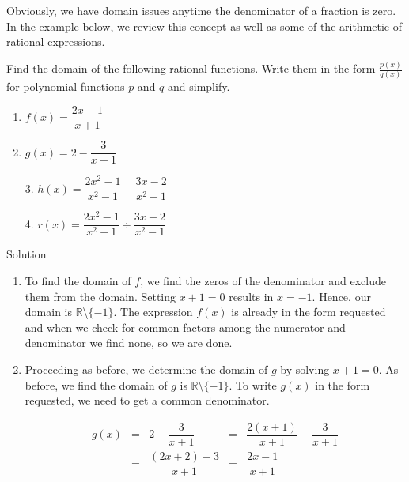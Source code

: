 Obviously, we have domain issues anytime the denominator of a fraction is zero.  In the example below, we review this concept as well as some of the arithmetic of rational expressions.

\begin{example} \label{ratfuncex} Find the domain of the following rational functions.  Write them in the form $\frac{p(x)}{q(x)}$ for polynomial functions $p$ and $q$ and simplify.

\begin{multicols}{2}
\begin{enumerate}

\item  $f(x) = \dfrac{2x-1}{x+1}$
\item  $g(x) = 2 - \dfrac{3}{x+1}$
\end{enumerate}
\end{multicols}

\ifcourse
\begin{multicols}{2}
\begin{enumerate}

\item[3.]  $h(x) = \dfrac{2x^2-1}{x^2-1} - \dfrac{3x-2}{x^2-1}$
\item[4.]  $r(x) = \dfrac{2x^2-1}{x^2-1} \div \dfrac{3x-2}{x^2-1}$

\end{enumerate}
\end{multicols}
\fi

Solution 

\begin{enumerate}

\item To find the domain of $f$, we  find the zeros of the denominator and exclude them from the domain.  Setting $x+1=0$ results in  $x=-1$. Hence, our domain is  $\mathbb{R}$\textbackslash$\{-1\}$.  The expression $f(x)$ is already in the form requested and when we check for common factors among the numerator and denominator we find none, so we are done.


\item  Proceeding as before, we determine the domain of $g$ by solving $x+1=0$.  As before, we find the domain of $g$ is $\mathbb{R}$\textbackslash$\{-1\}$.  To write $g(x)$ in the form requested, we need to get a common denominator.


\[ \begin{array}{rclcl}

g(x) & = & 2 - \dfrac{3}{x+1}  & = & \dfrac{2(x+1)}{x+1} - \dfrac{3}{x+1} \\ [.15in]
     & = & \dfrac{(2x+2) - 3}{x+1} & = & \dfrac{2x-1}{x+1}  \\ \end{array} \]


\end{enumerate}
\end{example}
